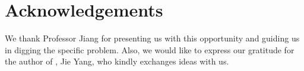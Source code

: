 \documentclass[letterpaper]{article} %
\begin{document}
\bigskip

\section{Acknowledgements}
We thank Professor Jiang for presenting us with this opportunity and guiding us in digging the specific problem. Also, we would like to express our gratitude for the author of \cite{lattice}, Jie Yang, who kindly exchanges ideas with us.



 

\end{document}
